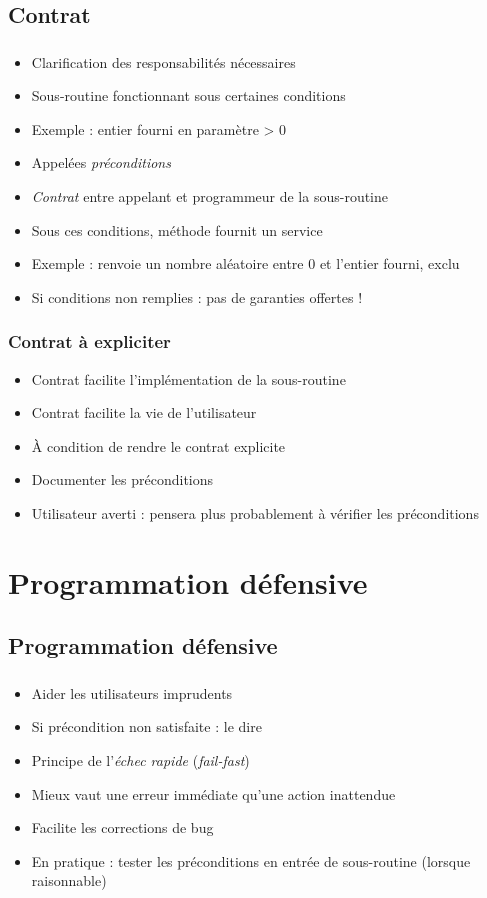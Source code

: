 \documentclass[english, french]{beamer}
\begin{document}
\subsection{Contrat}
\begin{frame}
	\frametitle{\subsecname}
	\begin{itemize}
		\item Clarification des responsabilités nécessaires
		\item Sous-routine fonctionnant sous certaines conditions
		\item Exemple : entier fourni en paramètre > 0
		\item Appelées \emph{préconditions}
		\item \emph{Contrat} entre appelant et programmeur de la sous-routine
		\item Sous ces conditions, méthode fournit un service
		\item Exemple : renvoie un nombre aléatoire entre 0 et l’entier fourni, exclu
		\item Si conditions non remplies : pas de garanties offertes !
	\end{itemize}
\end{frame}

\begin{frame}
	\frametitle{Contrat à expliciter}
	\begin{itemize}
		\item Contrat facilite l’implémentation de la sous-routine
		\item Contrat facilite la vie de l’utilisateur
		\item À condition de rendre le contrat explicite
		\item Documenter les préconditions
		\item Utilisateur averti : pensera plus probablement à vérifier les préconditions
	\end{itemize}
\end{frame}

\section{Programmation défensive}
\subsection{Programmation défensive}
\begin{frame}
	\frametitle{\subsecname}
	\begin{itemize}
		\item Aider les utilisateurs imprudents
		\item Si précondition non satisfaite : le dire
		\item Principe de l’\emph{échec rapide} (\emph{fail-fast})
		\item Mieux vaut une erreur immédiate qu’une action inattendue
		\item Facilite les corrections de bug
		\item En pratique : tester les préconditions en entrée de sous-routine (lorsque raisonnable)
	\end{itemize}
\end{frame}
\end{document}
